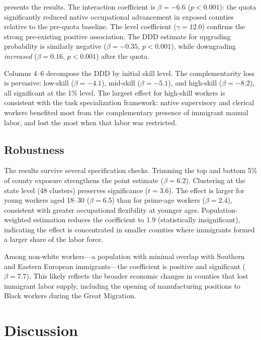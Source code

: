 \documentclass[12pt]{article}
\begin{document}
 presents the results. The interaction coefficient is $\beta = -6.6$ ($p < 0.001$): the quota significantly reduced native occupational advancement in exposed counties relative to the pre-quota baseline. The level coefficient ($\gamma = 12.0$) confirms the strong pre-existing positive association. The DDD estimate for upgrading probability is similarly negative ($\beta = -0.35$, $p < 0.001$), while downgrading \emph{increased} ($\beta = 0.16$, $p < 0.001$) after the quota.

Columns 4--6 decompose the DDD by initial skill level. The complementarity loss is pervasive: low-skill ($\beta = -4.1$), mid-skill ($\beta = -5.1$), and high-skill ($\beta = -8.2$), all significant at the 1\% level. The largest effect for high-skill workers is consistent with the task specialization framework: native supervisory and clerical workers benefited most from the complementary presence of immigrant manual labor, and lost the most when that labor was restricted.



\subsection{Robustness}

The results survive several specification checks. Trimming the top and bottom 5\% of county exposure strengthens the point estimate ($\beta = 6.2$). Clustering at the state level (48 clusters) preserves significance ($t = 3.6$). The effect is larger for young workers aged 18--30 ($\beta = 6.5$) than for prime-age workers ($\beta = 2.4$), consistent with greater occupational flexibility at younger ages. Population-weighted estimation reduces the coefficient to 1.9 (statistically insignificant), indicating the effect is concentrated in smaller counties where immigrants formed a larger share of the labor force.

Among non-white workers---a population with minimal overlap with Southern and Eastern European immigrants---the coefficient is positive and significant ($\beta = 7.7$). This likely reflects the broader economic changes in counties that lost immigrant labor supply, including the opening of manufacturing positions to Black workers during the Great Migration.


\section{Discussion}
\label{sec:discussion}
\end{document}
